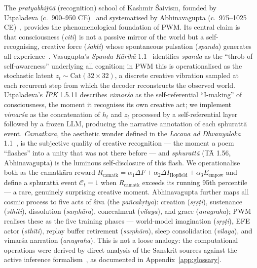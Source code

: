 \documentclass[journal,onecolumn,11pt]{IEEEtran}
\begin{document}
The \emph{pratyabhijñā} (recognition) school of Kashmir Śaivism, founded by
Utpaladeva (c.\ 900--950 CE)~\cite{utpaladeva1994isvara,torella1994isvara}
and systematised by Abhinavagupta (c.\ 975--1025
CE)~\cite{abhinavagupta2012tantraloka,wallis2012tantra,flood1996introduction},
provides the phenomenological foundation of PWM.
Its central claim is that consciousness (\emph{citi}) is not a passive mirror
of the world but a self-recognising, creative force (\emph{śakti}) whose
spontaneous pulsation (\emph{spanda}) generates all
experience~\cite{kshemaraja2000pratyabhijna}.
Vasugupta's \emph{Spanda Kārikā}
1.1~\cite{vasugupta1992spanda,dyczkowski1992spanda} identifies \emph{spanda}
as the ``throb of self-awareness'' underlying all cognition; in PWM this is
operationalised as the stochastic latent $z_t \sim \text{Cat}(32{\times}32)$,
a discrete creative vibration sampled at each recurrent step from which the
decoder reconstructs the observed world.
Utpaladeva's \emph{ĪPK} 1.5.11 describes \emph{vimarśa} as the
self-referential ``I-making'' of consciousness, the moment it recognises its
own creative act; we implement \emph{vimarśa} as the concatenation of $h_t$
and $z_t$ processed by a self-referential layer followed by a frozen LLM,
producing the narrative annotation of each sphurattā event.
\emph{Camatkāra}, the aesthetic wonder defined in the
\emph{Locana ad Dhvanyāloka} 1.1~\cite{abhinava1992locana}, is the
subjective quality of creative recognition --- the moment a poem ``flashes''
into a unity that was not there before --- and \emph{sphurattā} (TĀ 1.56,
Abhinavagupta) is the luminous self-disclosure of this flash.
We operationalise both as the camatkāra reward
$R_{\text{camatk}} = \alpha_1 \Delta F + \alpha_2 \Delta I_{\text{Hopfield}}
+ \alpha_3 E_{\text{empow}}$
and define a sphurattā event $\mathcal{C}_t = 1$ when $R_{\text{camatk}}$
exceeds its running 95th percentile --- a rare, genuinely surprising creative
moment.
Abhinavagupta further maps all cosmic process to five acts of śiva (the
\emph{pañcakṛtya}): creation (\emph{sṛṣṭi}), sustenance (\emph{sthiti}),
dissolution (\emph{saṃhāra}), concealment (\emph{vilaya}), and grace
(\emph{anugraha}); PWM realises these as the five training phases ---
world-model imagination (\emph{sṛṣṭi}), EFE actor (\emph{sthiti}), replay
buffer retirement (\emph{saṃhāra}), sleep consolidation (\emph{vilaya}), and
vimarśa narration (\emph{anugraha}).
This is not a loose analogy: the computational operations were derived by
direct analysis of the Sanskrit sources against the active inference
formalism~\cite{friston2010free,friston2017active}, as documented in
Appendix~\ref{app:glossary}.
\end{document}
